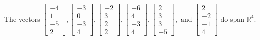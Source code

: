 \begin{exercise}
\begin{exerciseStatement}
  \end{exerciseStatement}
  \begin{exerciseAnswer}
   The vectors \(\left[\begin{array}{r}
-4 \\
1 \\
-5 \\
2
\end{array}\right] , \left[\begin{array}{r}
-3 \\
0 \\
-3 \\
4
\end{array}\right] , \left[\begin{array}{r}
-2 \\
3 \\
2 \\
2
\end{array}\right] , \left[\begin{array}{r}
-6 \\
4 \\
-3 \\
4
\end{array}\right] , \left[\begin{array}{r}
2 \\
3 \\
3 \\
-5
\end{array}\right] , \text{ and } \left[\begin{array}{r}
2 \\
-2 \\
-1 \\
4
\end{array}\right]\) 
  	 do  
	span \(\mathbb{R}^4\).
  


  \end{exerciseAnswer}
\end{exercise}